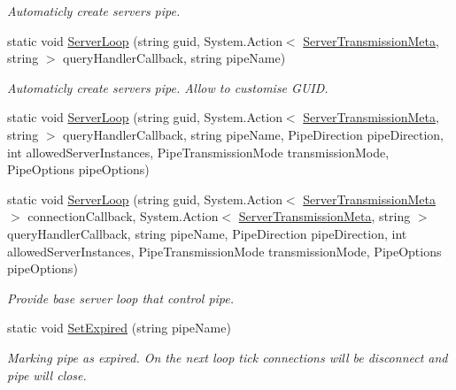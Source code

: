 \begin{DoxyCompactItemize}
\begin{DoxyCompactList}\small\item\em Automaticly create server\textquotesingle{}s pipe. \end{DoxyCompactList}\item 
static void \mbox{\hyperlink{class_pipes_provider_1_1_a_p_i_aef65cfb6e72f44adf25b3cf8bc0d8656}{Server\+Loop}} (string guid, System.\+Action$<$ \mbox{\hyperlink{class_pipes_provider_1_1_server_transmission_meta}{Server\+Transmission\+Meta}}, string $>$ query\+Handler\+Callback, string pipe\+Name)
\begin{DoxyCompactList}\small\item\em Automaticly create server\textquotesingle{}s pipe. Allow to customise G\+U\+ID. \end{DoxyCompactList}\item 
static void \mbox{\hyperlink{class_pipes_provider_1_1_a_p_i_abf7202abca50566888c625b928d0cbaa}{Server\+Loop}} (string guid, System.\+Action$<$ \mbox{\hyperlink{class_pipes_provider_1_1_server_transmission_meta}{Server\+Transmission\+Meta}}, string $>$ query\+Handler\+Callback, string pipe\+Name, Pipe\+Direction pipe\+Direction, int allowed\+Server\+Instances, Pipe\+Transmission\+Mode transmission\+Mode, Pipe\+Options pipe\+Options)
\item 
static void \mbox{\hyperlink{class_pipes_provider_1_1_a_p_i_ab18891bb1d9c04a9c9144e0d8c89aebf}{Server\+Loop}} (string guid, System.\+Action$<$ \mbox{\hyperlink{class_pipes_provider_1_1_server_transmission_meta}{Server\+Transmission\+Meta}} $>$ connection\+Callback, System.\+Action$<$ \mbox{\hyperlink{class_pipes_provider_1_1_server_transmission_meta}{Server\+Transmission\+Meta}}, string $>$ query\+Handler\+Callback, string pipe\+Name, Pipe\+Direction pipe\+Direction, int allowed\+Server\+Instances, Pipe\+Transmission\+Mode transmission\+Mode, Pipe\+Options pipe\+Options)
\begin{DoxyCompactList}\small\item\em Provide base server loop that control pipe. \end{DoxyCompactList}\item 
static void \mbox{\hyperlink{class_pipes_provider_1_1_a_p_i_ab525aaa0c87f23cfbe4ad6d0ed1b1b4c}{Set\+Expired}} (string pipe\+Name)
\begin{DoxyCompactList}\small\item\em Marking pipe as expired. On the next loop tick connections will be disconnect and pipe will close. \end{DoxyCompactList}\item 

\end{DoxyCompactItemize}
